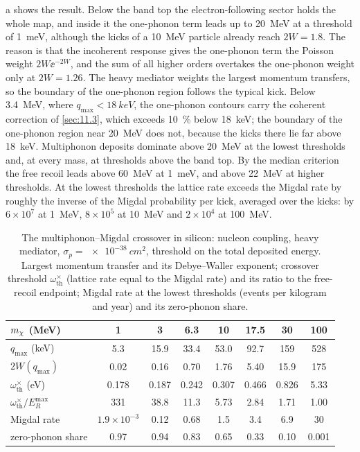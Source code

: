a shows the result. Below the band top the electron-following sector holds the whole map, and inside it the one-phonon term leads up to \SI{20}{MeV} at a threshold of \SI{1}{meV}, although the kicks of a \SI{10}{MeV} particle already reach $2W = 1.8$. The reason is that the incoherent response gives the one-phonon term the Poisson weight $2W\ee^{-2W}$, and the sum of all higher orders overtakes the one-phonon weight only at $2W = 1.26$. The heavy mediator weights the largest momentum transfers, so the boundary of the one-phonon region follows the typical kick. Below \SI{3.4}{MeV}, where $q_{\mathrm{max}} < \SI{18}{keV}$, the one-phonon contours carry the coherent correction of \cref{sec:11.3}, which exceeds \SI{10}{\percent} below \SI{18}{keV}; the boundary of the one-phonon region near \SI{20}{MeV} does not, because the kicks there lie far above \SI{18}{keV}. Multiphonon deposits dominate above \SI{20}{MeV} at the lowest thresholds and, at every mass, at thresholds above the band top. By the median criterion the free recoil leads above \SI{60}{MeV} at \SI{1}{meV}, and above \SI{22}{MeV} at higher thresholds. At the lowest thresholds the lattice rate exceeds the Migdal rate by roughly the inverse of the Migdal probability per kick, averaged over the kicks: by $6\times10^7$ at \SI{1}{MeV}, $8\times10^5$ at \SI{10}{MeV} and $2\times10^4$ at \SI{100}{MeV}.

\begin{table}[tbp]
  \caption{The multiphonon--Migdal crossover in silicon: nucleon coupling, heavy mediator, $\sigma_p = \SI{e-38}{cm^2}$, threshold on the total deposited energy. Largest momentum transfer and its Debye--Waller exponent; crossover threshold $\omega_{\mathrm{th}}^\times$ (lattice rate equal to the Migdal rate) and its ratio to the free-recoil endpoint; Migdal rate at the lowest thresholds (events per kilogram and year) and its zero-phonon share.}
  \label{tab:17-crossover}
  \centering\small
  \begin{tabular}{@{}lccccccc@{}}
    \toprule
    $m_{\chi}$ (MeV) & 1 & 3 & 6.3 & 10 & 17.5 & 30 & 100 \\
    \midrule
    $q_{\mathrm{max}}$ (keV) & 5.3 & 15.9 & 33.4 & 53.0 & 92.7 & 159 & 528 \\
    $2W(q_{\mathrm{max}})$ & 0.02 & 0.16 & 0.70 & 1.76 & 5.40 & 15.9 & 175 \\
    $\omega_{\mathrm{th}}^\times$ (eV) & 0.178 & 0.187 & 0.242 & 0.307 & 0.466 & 0.826 & 5.33 \\
    $\omega_{\mathrm{th}}^\times/E_R^{\mathrm{max}}$ & 331 & 38.8 & 11.3 & 5.73 & 2.84 & 1.71 & 1.00 \\
    Migdal rate & $1.9\times10^{-3}$ & 0.12 & 0.68 & 1.5 & 3.4 & 6.9 & 30 \\
    zero-phonon share & 0.97 & 0.94 & 0.83 & 0.65 & 0.33 & 0.10 & 0.001 \\
    \bottomrule
  \end{tabular}
\end{table}


